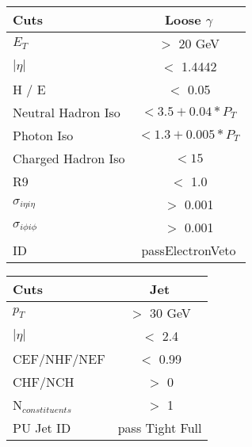 \documentclass[landscape]{article}
\begin{document}
\begin{small}
\begin{center}
    \vspace{10 mm}

    \begin{tabular}{ | l | c | }
      \hline \hline
      Cuts & Loose $\gamma$ \\ \hline
      $E_{T}$ & $>$ 20 GeV \\ \hline
      $|\eta|$ & $<$ 1.4442 \\ \hline
      H / E & $<$ 0.05 \\ \hline
      Neutral Hadron Iso & $< 3.5 + 0.04*P_{T}$ \\ \hline
      Photon Iso & $< 1.3 + 0.005*P_{T}$ \\ \hline
      Charged Hadron Iso & $< 15$ \\ \hline
      R9 & $<$ 1.0 \\ \hline
      $\sigma_{i\eta i\eta}$ & $>$ 0.001 \\ \hline
      $\sigma_{i\phi i\phi}$ & $>$ 0.001 \\ \hline
      ID & passElectronVeto \\
      \hline \hline
    \end{tabular}

    \vspace {10 mm}

    \begin{tabular}{ | l | c | }
      \hline \hline
      Cuts & Jet \\ \hline
      $p_{T}$ & $>$ 30 GeV \\ \hline
      $|\eta|$ & $<$ 2.4 \\ \hline
      CEF/NHF/NEF & $<$ 0.99 \\ \hline
      CHF/NCH & $>$ 0 \\ \hline
      N$_{constituents}$ & $>$ 1 \\ \hline
      PU Jet ID & pass Tight Full \\
      \hline \hline
    \end{tabular}

    \vspace{10 mm}


\end{center}
\end{small}
\end{document}
